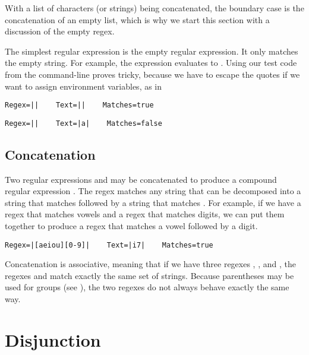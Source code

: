 With a list of characters (or strings) being concatenated, the
boundary case is the concatenation of an empty list, which is why we
start this section with a discussion of the empty regex.

The simplest regular expression is the empty regular expression.  It
only matches the empty string.  For example, the expression
 evaluates to
.  Using our test code from the command-line proves tricky,
because we have to escape the quotes if we want to assign environment
variables, as in 
%
\begin{verbatim}
Regex=||    Text=||    Matches=true
\end{verbatim}
%
\begin{verbatim}
Regex=||    Text=|a|    Matches=false
\end{verbatim}


\subsection{Concatenation}

Two regular expressions  and  may be
concatenated to produce a compound regular expression .
The regex  matches any string that can be decomposed into
a string that matches  followed by a string that matches
.  For example, if we have a regex \code{[aeiou]} that
matches vowels and a regex  that matches digits, we can put
them together to produce a regex that matches a vowel followed by a
digit.
%
\begin{verbatim}
Regex=|[aeiou][0-9]|    Text=|i7|    Matches=true
\end{verbatim}

Concatenation is associative, meaning that if we have three regexes
, , and , the regexes
 and
 match exactly the same set
of strings.  Because parentheses may be used for groups (see
), the two regexes do not always behave exactly
the same way.  


\section{Disjunction}

